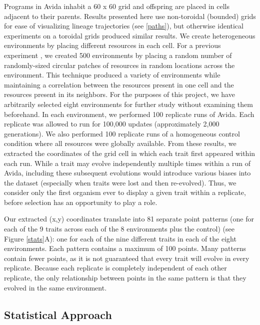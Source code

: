 Programs in Avida inhabit a 60 x 60 grid and offspring are placed in cells adjacent to their parents. Results presented here use non-toroidal (bounded) grids for ease of visualizing lineage trajectories (see \ref{paths}), but otherwise identical experiments on a toroidal grids produced similar results.  We create heterogeneous environments by placing different resources in each cell. For a previous experiment \citep{dolson_spatial_2017}, we created 500 environments by placing a random number of randomly-sized circular patches of resources in random locations across the environment. This technique produced a variety of environments while maintaining a correlation between the resources present in one cell and the resources present in its neighbors. For the purposes of this project, we have arbitrarily selected eight environments for further study without examining them beforehand. In each environment, we performed 100 replicate runs of Avida. Each replicate was allowed to run for 100,000 updates (approximately 2,000 generations). We also performed 100 replicate runs of a homogeneous control condition where all resources were globally available. From these results, we extracted the coordinates of the grid cell in which each trait first appeared within each run. While a trait may evolve independently multiple times within a run of Avida, including these subsequent evolutions would introduce various biases into the dataset (especially when traits were lost and then re-evolved). Thus, we consider only the first organism ever to display a given trait within a replicate, before selection has an opportunity to play a role.

Our extracted (x,y) coordinates translate into 81 separate point patterns (one for each of the 9 traits across each of the 8 environments plus the control) (see Figure \ref{stats}A): one for each of the nine different traits in each of the eight environments. Each pattern contains a maximum of 100 points. Many patterns contain fewer points, as it is not guaranteed that every trait will evolve in every replicate. Because each replicate is completely independent of each other replicate, the only relationship between points in the same pattern is that they evolved in the same environment.

\subsection{Statistical Approach}

